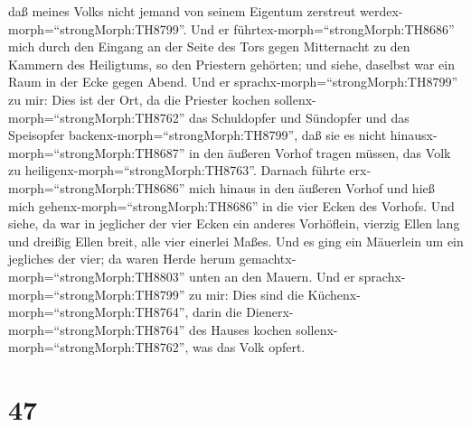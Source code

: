 daß meines Volks nicht jemand von seinem Eigentum zerstreut
werdex-morph=``strongMorph:TH8799''.  Und er
führtex-morph=``strongMorph:TH8686'' mich durch den Eingang an der Seite
des Tors gegen Mitternacht zu den Kammern des Heiligtums, so den
Priestern gehörten; und siehe, daselbst war ein Raum in der Ecke gegen
Abend.  Und er sprachx-morph=``strongMorph:TH8799'' zu mir:
Dies ist der Ort, da die Priester kochen
sollenx-morph=``strongMorph:TH8762'' das Schuldopfer und Sündopfer und
das Speisopfer backenx-morph=``strongMorph:TH8799'', daß sie es nicht
hinausx-morph=``strongMorph:TH8687'' in den äußeren Vorhof tragen
müssen, das Volk zu heiligenx-morph=``strongMorph:TH8763''.
 Darnach führte erx-morph=``strongMorph:TH8686'' mich
hinaus in den äußeren Vorhof und hieß mich
gehenx-morph=``strongMorph:TH8686'' in die vier Ecken des Vorhofs.
 Und siehe, da war in jeglicher der vier Ecken ein anderes
Vorhöflein, vierzig Ellen lang und dreißig Ellen breit, alle vier
einerlei Maßes.  Und es ging ein Mäuerlein um ein jegliches
der vier; da waren Herde herum gemachtx-morph=``strongMorph:TH8803''
unten an den Mauern.  Und er
sprachx-morph=``strongMorph:TH8799'' zu mir: Dies sind die
Küchenx-morph=``strongMorph:TH8764'', darin die
Dienerx-morph=``strongMorph:TH8764'' des Hauses kochen
sollenx-morph=``strongMorph:TH8762'', was das Volk opfert.

\hypertarget{section-46}{%
\section{47}\label{section-46}}

